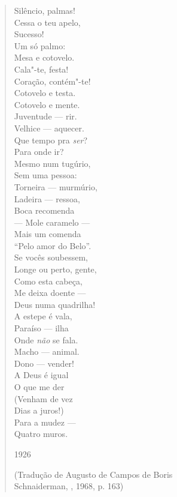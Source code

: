 \begin{verse}
Silêncio, palmas! \\
Cessa o teu apelo, \\
Sucesso! \\
Um só palmo: \\
Mesa e cotovelo. \\[8pt]
Cala"-te, festa! \\
Coração, contém"-te! \\
Cotovelo e testa. \\
Cotovelo e mente. \\[8pt]
Juventude --- rir. \\
Velhice --- aquecer. \\
Que tempo pra \emph{ser}? \\
Para onde ir? \\[8pt]
Mesmo num tugúrio, \\
Sem uma pessoa: \\
Torneira --- murmúrio, \\
Ladeira --- ressoa, \\[8pt]
Boca recomenda \\
--- Mole caramelo --- \\
Mais um comenda \\
``Pelo amor do Belo''. \\[8pt]
Se vocês soubessem, \\
Longe ou perto, gente, \\
Como esta cabeça, \\
Me deixa doente --- \\[8pt]
Deus numa quadrilha! \\
A estepe é vala, \\
Paraíso --- ilha \\
Onde \emph{não} se fala. \\[8pt]
Macho --- animal. \\
Dono --- vender! \\
A Deus é igual \\
O que me der \\[8pt]
(Venham de vez \\
Dias a juros!) \\
Para a mudez --- \\
Quatro muros. 

1926

(Tradução de Augusto de Campos de Boris\\ Schnaiderman, , 1968, p. 163)

  \end{verse}

